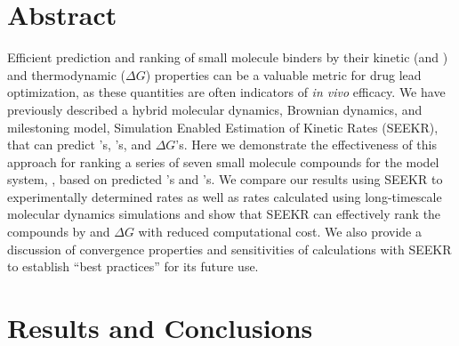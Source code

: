 
\section{Abstract}

Efficient prediction and ranking of small molecule binders by their kinetic (\kon and \koff) and thermodynamic ($\Delta G$) properties can be a valuable metric for
drug lead optimization, as these quantities are often indicators of \textit{in vivo} efficacy.
We have
previously described a hybrid molecular dynamics, Brownian dynamics, and milestoning model, Simulation Enabled Estimation of Kinetic
Rates (SEEKR), that can predict \kon's, \koff's, and $\Delta G$'s. Here we demonstrate the effectiveness of this approach for ranking a
series of seven small molecule compounds for the model system, \bcd, based on predicted \kon's and \koff's. We compare our results using
SEEKR to experimentally determined rates as well as rates calculated using long-timescale molecular dynamics simulations and show that
SEEKR can effectively rank the compounds by \koff and $\Delta G$ with reduced computational cost. We also provide a discussion of
convergence properties and sensitivities of calculations with SEEKR to establish ``best practices'' for its future use.

\section{Results and Conclusions}

